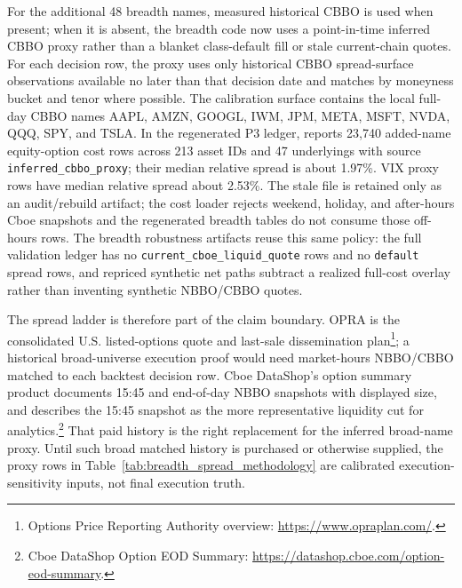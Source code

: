For the additional 48 breadth names, measured historical CBBO is used when present; when
it is absent, the breadth code now uses a point-in-time inferred CBBO proxy rather than a
blanket class-default fill or stale current-chain quotes. For each decision row, the proxy
uses only historical CBBO spread-surface observations available no later than that
decision date and matches by moneyness bucket and tenor where possible. The calibration
surface contains the local full-day CBBO names AAPL, AMZN, GOOGL, IWM, JPM, META, MSFT,
NVDA, QQQ, SPY, and TSLA. In the regenerated P3 ledger,
 reports 23,740 added-name equity-option cost rows
across 213 asset IDs and 47 underlyings with source
\texttt{inferred\_cbbo\_proxy}; their median relative spread is about 1.97\%. VIX proxy
rows have median relative spread about 2.53\%. The stale
 file is retained only as an audit/rebuild
artifact; the cost loader rejects weekend, holiday, and after-hours Cboe snapshots and the
regenerated breadth tables do not consume those off-hours rows.
The breadth robustness artifacts reuse this same policy: the full validation ledger has no
\texttt{current\_cboe\_liquid\_quote} rows and no \texttt{default} spread rows, and
repriced synthetic net paths subtract a realized full-cost overlay rather than inventing
synthetic NBBO/CBBO quotes.

The spread ladder is therefore part of the claim boundary. OPRA is the consolidated U.S.
listed-options quote and last-sale dissemination plan\footnote{Options Price Reporting
Authority overview: \url{https://www.opraplan.com/}.}; a historical broad-universe
execution proof would need market-hours NBBO/CBBO matched to each backtest decision row.
Cboe DataShop's option summary product documents 15:45 and end-of-day NBBO snapshots with
displayed size, and describes the 15:45 snapshot as the more representative liquidity cut
for analytics.\footnote{Cboe DataShop Option EOD Summary:
\url{https://datashop.cboe.com/option-eod-summary}.} That paid history is the right
replacement for the inferred broad-name proxy. Until such broad matched history is
purchased or otherwise supplied, the proxy rows in
Table~\ref{tab:breadth_spread_methodology} are calibrated execution-sensitivity inputs,
not final execution truth.

